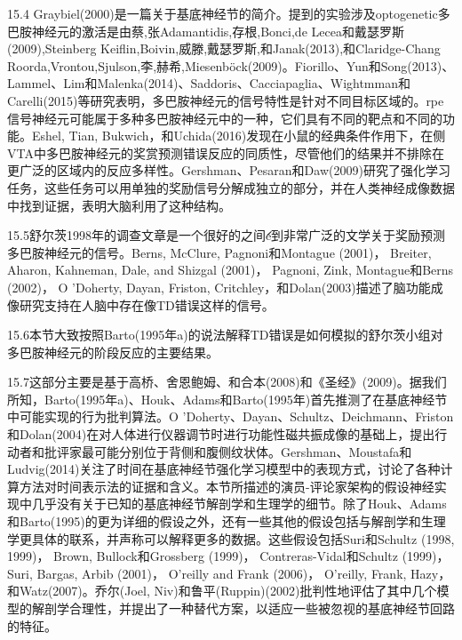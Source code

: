 15.4 Graybiel(2000)是一篇关于基底神经节的简介。提到的实验涉及optogenetic多巴胺神经元的激活是由蔡,张Adamantidis,存根,Bonci,de Lecea和戴瑟罗斯(2009),Steinberg Keiflin,Boivin,威滕,戴瑟罗斯,和Janak(2013),和Claridge-Chang Roorda,Vrontou,Sjulson,李,赫希,Miesenböck(2009)。Fiorillo、Yun和Song(2013)、Lammel、Lim和Malenka(2014)、Saddoris、Cacciapaglia、Wightmman和Carelli(2015)等研究表明，多巴胺神经元的信号特性是针对不同目标区域的。rpe信号神经元可能属于多种多巴胺神经元中的一种，它们具有不同的靶点和不同的功能。Eshel, Tian, Bukwich，和Uchida(2016)发现在小鼠的经典条件作用下，在侧VTA中多巴胺神经元的奖赏预测错误反应的同质性，尽管他们的结果并不排除在更广泛的区域内的反应多样性。Gershman、Pesaran和Daw(2009)研究了强化学习任务，这些任务可以用单独的奖励信号分解成独立的部分，并在人类神经成像数据中找到证据，表明大脑利用了这种结构。

15.5舒尔茨1998年的调查文章是一个很好的之间́e到非常广泛的文学关于奖励预测多巴胺神经元的信号。Berns, McClure, Pagnoni和Montague (2001)， Breiter, Aharon, Kahneman, Dale, and Shizgal (2001)， Pagnoni, Zink, Montague和Berns (2002)， O 'Doherty, Dayan, Friston, Critchley，和Dolan(2003)描述了脑功能成像研究支持在人脑中存在像TD错误这样的信号。

15.6本节大致按照Barto(1995年a)的说法解释TD错误是如何模拟的舒尔茨小组对多巴胺神经元的阶段反应的主要结果。

15.7这部分主要是基于高桥、舍恩鲍姆、和合本(2008)和《圣经》(2009)。据我们所知，Barto(1995年a)、Houk、Adams和Barto(1995年)首先推测了在基底神经节中可能实现的行为批判算法。O 'Doherty、Dayan、Schultz、Deichmann、Friston和Dolan(2004)在对人体进行仪器调节时进行功能性磁共振成像的基础上，提出行动者和批评家最可能分别位于背侧和腹侧纹状体。Gershman、Moustafa和Ludvig(2014)关注了时间在基底神经节强化学习模型中的表现方式，讨论了各种计算方法对时间表示法的证据和含义。本节所描述的演员-评论家架构的假设神经实现中几乎没有关于已知的基底神经节解剖学和生理学的细节。除了Houk、Adams和Barto(1995)的更为详细的假设之外，还有一些其他的假设包括与解剖学和生理学更具体的联系，并声称可以解释更多的数据。这些假设包括Suri和Schultz (1998, 1999)， Brown, Bullock和Grossberg (1999)， Contreras-Vidal和Schultz (1999)， Suri, Bargas, Arbib (2001)， O’reilly and Frank (2006)， O’reilly, Frank, Hazy，和Watz(2007)。乔尔(Joel, Niv)和鲁平(Ruppin)(2002)批判性地评估了其中几个模型的解剖学合理性，并提出了一种替代方案，以适应一些被忽视的基底神经节回路的特征。

